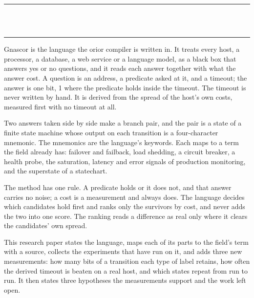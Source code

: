 \thispagestyle{empty}
\begin{center}
  \rule{\textwidth}{0.4pt}\\[0.9em]
  {\Large{}}\\[0.7em]
  \rule{\textwidth}{0.4pt}
\end{center}
\bigskip

\noindent Gnascor is the language the orior compiler is written in. It treats every host, a
processor, a database, a web service or a language model, as a black box that answers yes or no
questions, and it reads each answer together with what the answer cost. A question is an
address, a predicate asked at it, and a timeout; the answer is one bit, 1 where the predicate
holds inside the timeout. The timeout is never written by hand. It is derived from the spread
of the host's own costs, measured first with no timeout at all.

Two answers taken side by side make a branch pair, and the pair is a state of a finite state
machine whose output on each transition is a four-character mnemonic. The mnemonics are the
language's keywords. Each maps to a term the field already has: failover and failback, load
shedding, a circuit breaker, a health probe, the saturation, latency and error signals of
production monitoring, and the superstate of a statechart.

The method has one rule. A predicate holds or it does not, and that answer carries no noise; a
cost is a measurement and always does. The language decides which candidates hold first and
ranks only the survivors by cost, and never adds the two into one score. The ranking reads a
difference as real only where it clears the candidates' own spread.

This research paper states the language, maps each of its parts to the field's term with a
source, collects the experiments that have run on it, and adds three new measurements: how
many bits of a transition each type of label retains, how often the derived timeout is beaten on
a real host, and which states repeat from run to run. It then states three hypotheses the
measurements support and the work left open.
\cleardoublepage
